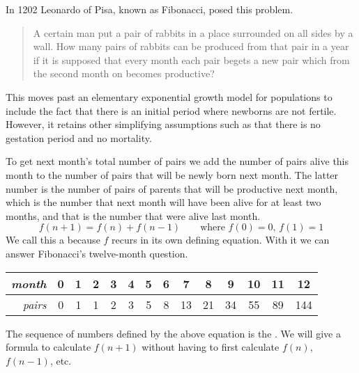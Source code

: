 
In 1202 Leonardo of Pisa, known as Fibonacci, posed this problem.
\begin{quotation}
  \noindent A certain man put a pair of rabbits in a place
  surrounded on all sides by a wall.
  How many pairs of rabbits can be produced from that pair in a year if it
  is supposed that every month each pair begets a new pair which from the
  second month on becomes productive?
\end{quotation}
This moves past an elementary exponential growth model for
populations
to include the fact that there is an initial period where 
newborns are not fertile.
However, it retains other simplifying assumptions such as  
that there is no gestation period and no mortality.

To get next month's total number of pairs 
we add the number of pairs alive this month to
the number of pairs that will be newly born next month.
The latter number is the number of pairs of parents that will be 
productive next month, which is the number that next month will 
have been alive for at least two months,
and that is the number that were alive last month.
\begin{equation*}
  f(n+1)=f(n)+f(n-1)  \qquad \text{where $f(0)=0$, $f(1)=1$}
\end{equation*}
We call this a 
because $f$ recurs in its own defining equation.
With it we can answer Fibonacci's twelve-month question.
\begin{center}
  \begin{tabular}{r|ccccccccccccc}
    \textit{month}
     &0  &1  &2  &3  &4  &5  &6  &7  &8  &9  &10  &11  &12  \\ \hline
    \textit{pairs}
     &0  &1  &1  &2  &3  &5  &8  &13  &21  &34  &55  &89  &144   
  \end{tabular}
\end{center}
The sequence of numbers defined by the above equation is the 
.
We will give a formula to
calculate $f(n+1)$ without having to first calculate $f(n)$, $f(n-1)$, etc.

